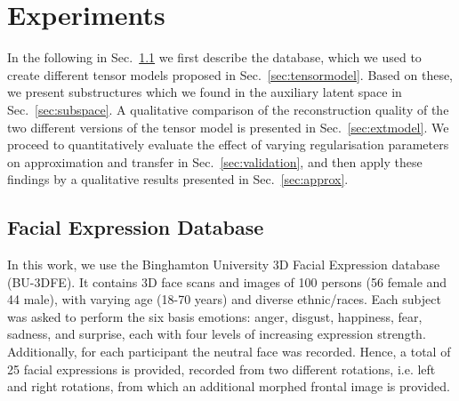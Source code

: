 \section{Experiments}\label{sec:results}

In the following in Sec.~\ref{sec:data} we first describe the database, which we used to create different tensor models proposed in Sec.~\ref{sec:tensormodel}. 
Based on these, we present substructures which we found in the auxiliary latent space in Sec.~\ref{sec:subspace}. 
A qualitative comparison of the reconstruction quality of the two different versions of the tensor model is presented in  Sec.~\ref{sec:extmodel}. 
We proceed to quantitatively evaluate the effect of varying regularisation parameters on approximation and transfer in Sec.~\ref{sec:validation}, and then apply these findings by a qualitative results presented in Sec.~\ref{sec:approx}. 

\subsection{Facial Expression Database} \label{sec:data}
In this work, we use the Binghamton University 3D Facial Expression database (BU-3DFE)\cite{bu3dfe}. 
It contains 3D face scans and images of 100 persons (56 female and 44  male), with varying age (18-70 years) and diverse ethnic/races. 
Each subject was asked to perform the six basis emotions: anger, disgust, happiness, fear, sadness, and surprise, each with four levels of increasing expression strength. 
Additionally, for each participant the neutral face was recorded.
Hence, a total of 25 facial expressions is provided, recorded from two different rotations, %
i.e. left and right rotations, from which an additional morphed frontal image is provided.
% 

